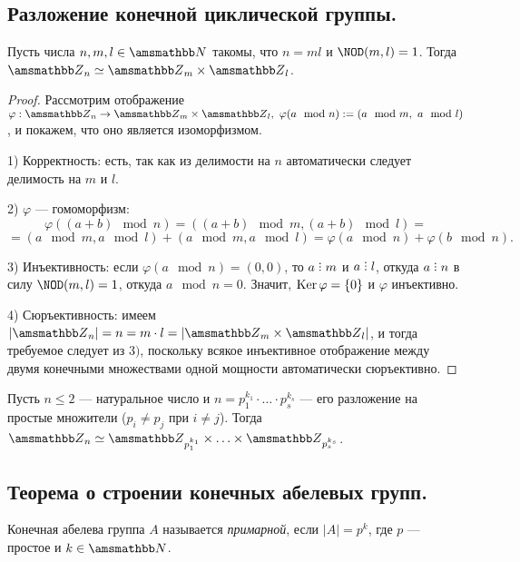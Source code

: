 \subsection{Разложение конечной циклической группы.}

\begin{theorem}
    Пусть числа $n, m, l \in \NN$ такомы, что $n = ml$ и $\NOD(m,l) = 1$.
    Тогда $\ZZ_n \simeq \ZZ_m \times \ZZ_l$.
\end{theorem}

\begin{proof}
    Рассмотрим отображение $\varphi: \ZZ_n \to \ZZ_m \times \ZZ_l, \
    \varphi(a \mod n) := (a \mod m, \ a \mod l)$, и покажем, что 
    оно является изоморфизмом.

    1) Корректность: есть, так как из делимости на $n$ автоматически следует
    делимость на $m$ и $l$.

    2) $\varphi$ --- гомоморфизм:
    \[
        \varphi((a + b) \mod n) = ((a + b) \mod m, (a + b) \mod l) = 
    \]
    \[
        = (a \mod m, a \mod l) + (a \mod m, a \mod l) = 
        \varphi(a \mod n) + \varphi(b \mod n).
    \]
    
    3) Инъективность: если $\varphi(a \mod n) = (0, 0)$, то $a \divby m$ и
    $a \divby l$, откуда $a \divby n$ в силу
    $\NOD(m, l) = 1$, откуда $a \mod n = 0$. Значит, $\operatorname{Ker} \varphi = \{0\}$ и
    $\varphi$ инъективно.

    4) Сюръективность: имеем $|\ZZ_n| = n = m \cdot l = |\ZZ_m \times \ZZ_l|$,
    и тогда требуемое следует из $3)$, поскольку всякое инъективное отображение
    между двумя конечными множествами одной мощности автоматически сюръективно.
\end{proof}

\begin{corollary}

    Пусть $n \leq 2$ --- натуральное число и
    $n = p_1^{k_1} \cdot \ldots \cdot p_s^{k_s}$ --- его разложение на простые
    множители ($p_i \ne p_j$ при $i \ne j$). 
    Тогда $\ZZ_n \simeq \ZZ_{p_1^{k_1}} \times \ldots \times \ZZ_{p_s^{k_s}}$.
\end{corollary}

\subsection{Теорема о строении конечных абелевых групп.}

\begin{definition}
    Конечная абелева группа $A$ называется \textit{примарной}, если
    $|A| = p^{k}$, где $p$ --- простое и $k \in \NN$.
\end{definition}

